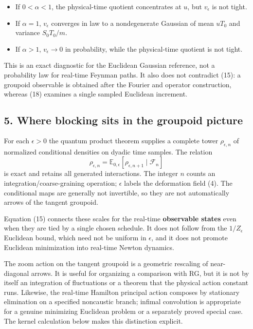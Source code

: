 \documentclass[11pt,a4paper]{article}
\newcommand{\tightlist}{\setlength{\itemsep}{0pt}\setlength{\parskip}{0pt}}
\begin{document}
\begin{itemize}
\tightlist
\item
  If \(0<\alpha<1\), the physical-time quotient concentrates at \(u\),
  but \(v_\epsilon\) is not tight.
\item
  If \(\alpha=1\), \(v_\epsilon\) converges in law to a nondegenerate
  Gaussian of mean \(uT_0\) and variance \(S_0T_0/m\).
\item
  If \(\alpha>1\), \(v_\epsilon\to0\) in probability, while the
  physical-time quotient is not tight.
\end{itemize}

This is an exact diagnostic for the Euclidean Gaussian reference, not a
probability law for real-time Feynman paths. It also does not contradict
(15): a groupoid observable is obtained after the Fourier and operator
construction, whereas (18) examines a single sampled Euclidean
increment.

\subsection{5. Where blocking sits in the groupoid
picture}\label{where-blocking-sits-in-the-groupoid-picture}

For each \(\epsilon>0\) the quantum product theorem supplies a complete
tower \(\rho_{\epsilon,n}\) of normalized conditional densities on
dyadic time samples. The relation \[\rho_{\epsilon,n}
 =\mathbb E_{0,\epsilon}[
          \rho_{\epsilon,n+1}\mid\mathcal F_n]\tag{19}\] is exact and
retains all generated interactions. The integer \(n\) counts an
integration/coarse-graining operation; \(\epsilon\) labels the
deformation field (4). The conditional maps are generally not
invertible, so they are not automatically arrows of the tangent
groupoid.

Equation (15) connects these scales for the real-time \textbf{observable
states} even when they are tied by a single chosen schedule. It does not
follow from the \(1/Z_{\epsilon}\) Euclidean bound, which need not be
uniform in \(\epsilon\), and it does not promote Euclidean minimization
into real-time Newton dynamics.

The zoom action on the tangent groupoid is a geometric rescaling of
near-diagonal arrows. It is useful for organizing a comparison with RG,
but it is not by itself an integration of fluctuations or a theorem that
the physical action constant runs. Likewise, the real-time Hamilton
principal action composes by stationary elimination on a specified
noncaustic branch; infimal convolution is appropriate for a genuine
minimizing Euclidean problem or a separately proved special case. The
kernel calculation below makes this distinction explicit.
\end{document}
